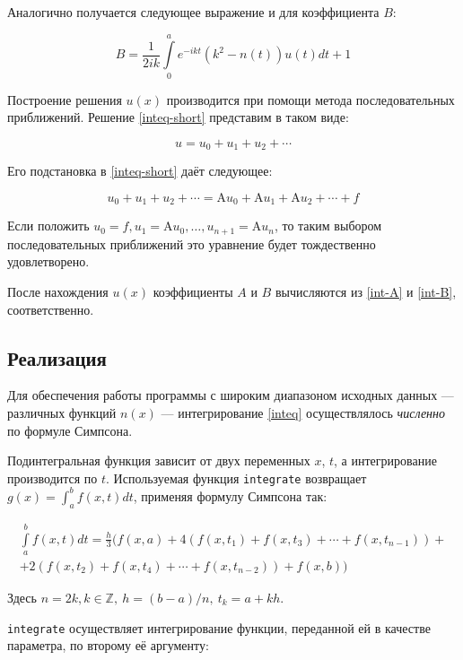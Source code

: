 \documentclass{article}
\newcommand{\procname}[1]{\texttt{#1}}
\providecommand{\op}[1]{\mathrm{#1}}
\numberwithin{equation}{section}
\begin{document}
Аналогично получается следующее выражение и для коэффициента $B$:

\begin{equation}\label{int-B}
  B = \frac{1}{2ik} \int \limits_{0}^{a} {e^{-ikt} (k^2-n(t)) u(t) dt} + 1
\end{equation}

Построение решения $u(x)$ производится при помощи метода
последовательных приближений. Решение \eqref{inteq-short} представим в
таком виде:

\[
u = u_0 + u_1 + u_2 + \dotsb
\]

Его подстановка в \eqref{inteq-short} даёт следующее:

\[
 u_0 + u_1 + u_2 + \dotsb = \op{A}u_0 + \op{A}u_1 +
 \op{A}u_2 + \dotsb + f
\]

Если положить $u_0=f, u_1=\op{A}u_0, \dotsc, u_{n+1}=\op{A} u_n$, то
таким выбором последовательных приближений это уравнение будет
тождественно удовлетворено.

После нахождения $u(x)$ коэффициенты $A$ и $B$ вычисляются из
\eqref{int-A} и \eqref{int-B}, соответственно.

\clearpage
\subsection{Реализация}

Для обеспечения работы программы с широким диапазоном исходных данных
— различных функций $n(x)$ — интегрирование \eqref{inteq}
осуществлялось \emph{численно} по формуле Симпсона.

Подинтегральная функция зависит от двух переменных $x$, $t$, а
интегрирование производится по $t$. Используемая функция
\procname{integrate} возвращает $g(x) = \int_a^b{f(x, t) dt}$,
применяя формулу Симпсона так:

\begin{equation}\label{simpson}
  \begin{split}
    \int \limits_a^b {f(x, t) dt} = \frac{h}{3}
    (f(x, a) + 4 (f(x, t_1) + f(x, t_3) + \dotsb + f(x, t_{n-1})) + \\
    + 2 (f(x, t_2) + f(x, t_4) + \dotsb + f(x, t_{n-2})) + f(x, b))
  \end{split}
\end{equation}

Здесь $n = 2k, k \in \mathbb{Z},\ h = (b-a)/n,\ t_k = a+kh$.

\procname{integrate} осуществляет интегрирование функции, переданной
ей в качестве параметра, по второму её аргументу:
\end{document}
